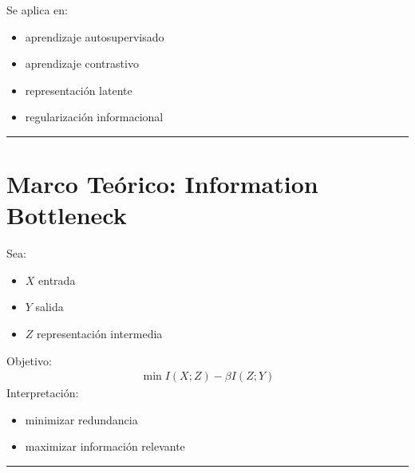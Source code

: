 \documentclass[letterpaper,10pt,english]{jupyterBook}
\begin{document}
\sphinxAtStartPar
Se aplica en:
\begin{itemize}
\item {} 
\sphinxAtStartPar
aprendizaje auto\sphinxhyphen{}supervisado

\item {} 
\sphinxAtStartPar
aprendizaje contrastivo

\item {} 
\sphinxAtStartPar
representación latente

\item {} 
\sphinxAtStartPar
regularización informacional

\end{itemize}


\bigskip\hrule\bigskip



\section{Marco Teórico: Information Bottleneck}
\label{\detokenize{04_data_science_applications/deep_learning_mi:marco-teorico-information-bottleneck}}
\sphinxAtStartPar
Sea:
\begin{itemize}
\item {} 
\sphinxAtStartPar
\(X\) entrada

\item {} 
\sphinxAtStartPar
\(Y\) salida

\item {} 
\sphinxAtStartPar
\(Z\) representación intermedia

\end{itemize}

\sphinxAtStartPar
Objetivo:
\begin{equation*}
\begin{split}
\min I(X;Z) - \beta I(Z;Y)
\end{split}
\end{equation*}
\sphinxAtStartPar
Interpretación:
\begin{itemize}
\item {} 
\sphinxAtStartPar
minimizar redundancia

\item {} 
\sphinxAtStartPar
maximizar información relevante

\end{itemize}


\bigskip\hrule\bigskip
\end{document}
